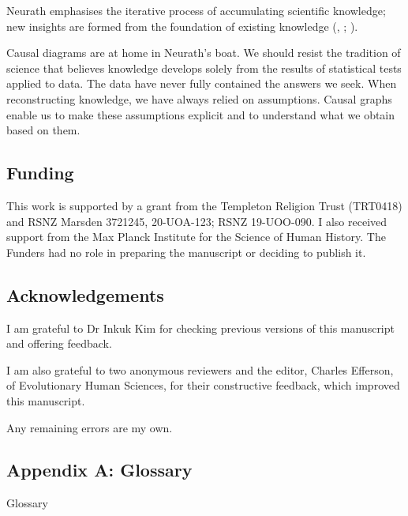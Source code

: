 \documentclass[
  single column]{article}
\begin{document}
Neurath emphasises the iterative process of accumulating scientific
knowledge; new insights are formed from the foundation of existing
knowledge (,
;
).

Causal diagrams are at home in Neurath's boat. We should resist the
tradition of science that believes knowledge develops solely from the
results of statistical tests applied to data. The data have never fully
contained the answers we seek. When reconstructing knowledge, we have
always relied on assumptions. Causal graphs enable us to make these
assumptions explicit and to understand what we obtain based on them.

\newpage{}

\subsection{Funding}\label{funding}

This work is supported by a grant from the Templeton Religion Trust
(TRT0418) and RSNZ Marsden 3721245, 20-UOA-123; RSNZ 19-UOO-090. I also
received support from the Max Planck Institute for the Science of Human
History. The Funders had no role in preparing the manuscript or deciding
to publish it.

\subsection{Acknowledgements}\label{acknowledgements}

I am grateful to Dr Inkuk Kim for checking previous versions of this
manuscript and offering feedback.

I am also grateful to two anonymous reviewers and the editor, Charles
Efferson, of Evolutionary Human Sciences, for their constructive
feedback, which improved this manuscript.

Any remaining errors are my own.

\newpage{}

\subsection{Appendix A: Glossary}\label{id-app-a}

\begin{table}

\caption{\label{tbl-experiments}Glossary}

\centering{

\glossaryTerms

}

\end{table}%
\end{document}
